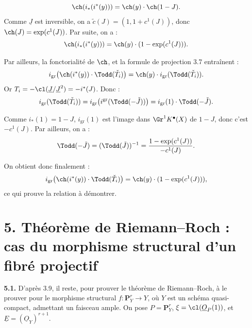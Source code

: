 
\[
 \ch(i_*(i^*(y)))=\ch(y)\cdot\ch(1-J).
\]
Comme \(\underline{J}\) est inversible, on a \(\widetilde c(J)=(1,1+c^1(J))\), donc \(\ch(J)=\exp(c^1(J))\).
Par suite, on a :
\[
 \ch(i_*(i^*(y)))=\ch(y)\cdot(1-\exp(c^1(J))).
\]

Par ailleurs, la fonctorialité de \(\ch\), et la formule de projection 3.7 entraînent :
\[
 i_{\mathrm{gr}}\bigl(\ch(i^*(y))\cdot\Todd(\check T_i)\bigr)
 =
 \ch(y)\cdot i_{\mathrm{gr}}(\Todd(\check T_i)).
\]
Or \(T_i=-\cl(\underline{J}/\underline{J}^2)=-i^*(J)\). Donc :
\[
 i_{\mathrm{gr}}(\Todd(\check T_i))
 =
 i_{\mathrm{gr}}\bigl(i^{\mathrm{gr}}(\Todd(-\check J))\bigr)
 =
 i_{\mathrm{gr}}(1)\cdot\Todd(-\check J).
\]

Comme \(i_*(1)=1-J\), \(i_{\mathrm{gr}}(1)\) est l'image dans \(\Gr^1K^{\bullet}(X)\) de \(1-J\), donc c'est \(-c^1(J)\). Par ailleurs, on a :
\[
 \Todd(-\check J)=(\Todd(\check J))^{-1}
 =
 \frac{1-\exp(c^1(J))}{-c^1(J)}.
\]

On obtient donc finalement :
\[
 i_{\mathrm{gr}}\bigl(\ch(i^*(y))\cdot\Todd(\check T_i)\bigr)
 =
 \ch(y)\cdot(1-\exp(c^1(J))),
\]
ce qui prouve la relation à démontrer.

\section*{5. Théorème de Riemann--Roch : cas du morphisme structural d'un fibré projectif}

\textbf{5.1.} D'après 3.9, il reste, pour prouver le théorème de Riemann--Roch, à le prouver pour le morphisme structural \(f:\mathbf{P}^r_Y\longrightarrow Y\), où \(Y\) est un schéma quasi-compact, admettant un faisceau ample. On pose \(P=\mathbf{P}^r_Y\), \(\xi=\cl(\underline{O}_P(1))\), et \(\underline{E}=(\underline{O}_Y)^{r+1}\).

